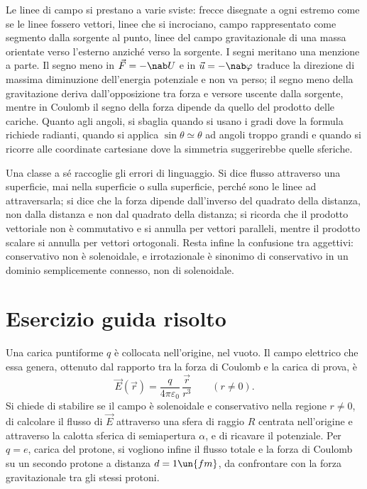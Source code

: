 \documentclass[main.tex]{subfiles}
\begin{document}
Le linee di campo si prestano a varie sviste: frecce disegnate a ogni estremo come se le linee fossero vettori, linee che si incrociano, campo rappresentato come segmento dalla sorgente al punto, linee del campo gravitazionale di una massa orientate verso l'esterno anziché verso la sorgente. I segni meritano una menzione a parte. Il segno meno in $\vec F=-\nab U$ e in $\vec u=-\nab\varphi$ traduce la direzione di massima diminuzione dell'energia potenziale e non va perso; il segno meno della gravitazione deriva dall'opposizione tra forza e versore uscente dalla sorgente, mentre in Coulomb il segno della forza dipende da quello del prodotto delle cariche. Quanto agli angoli, si sbaglia quando si usano i gradi dove la formula richiede radianti, quando si applica $\sin\theta\simeq\theta$ ad angoli troppo grandi e quando si ricorre alle coordinate cartesiane dove la simmetria suggerirebbe quelle sferiche.

Una classe a sé raccoglie gli errori di linguaggio. Si dice flusso attraverso una superficie, mai nella superficie o sulla superficie, perché sono le linee ad attraversarla; si dice che la forza dipende dall'inverso del quadrato della distanza, non dalla distanza e non dal quadrato della distanza; si ricorda che il prodotto vettoriale non è commutativo e si annulla per vettori paralleli, mentre il prodotto scalare si annulla per vettori ortogonali. Resta infine la confusione tra aggettivi: conservativo non è solenoidale, e irrotazionale è sinonimo di conservativo in un dominio semplicemente connesso, non di solenoidale.

\medskip

\section*{Esercizio guida risolto}
Una carica puntiforme $q$ è collocata nell'origine, nel vuoto. Il campo elettrico che essa genera, ottenuto dal rapporto tra la forza di Coulomb e la carica di prova, è
\[
\vec E(\vec r)=\frac{q}{4\pi\varepsilon_0}\,\frac{\vec r}{r^3}\qquad(r\neq0).
\]
Si chiede di stabilire se il campo è solenoidale e conservativo nella regione $r\neq0$, di calcolare il flusso di $\vec E$ attraverso una sfera di raggio $R$ centrata nell'origine e attraverso la calotta sferica di semiapertura $\alpha$, e di ricavare il potenziale. Per $q=e$, carica del protone, si vogliono infine il flusso totale e la forza di Coulomb su un secondo protone a distanza $d=1\un{fm}$, da confrontare con la forza gravitazionale tra gli stessi protoni.
\end{document}
